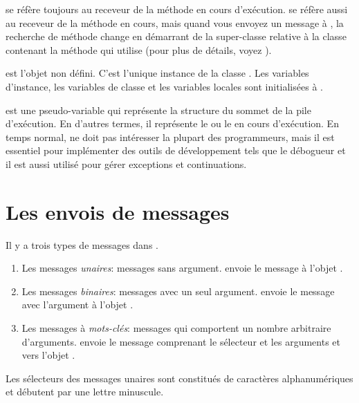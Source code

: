 \documentclass[a4paper,10pt,twoside]{book}
\begin{document}
 se r\'{e}f\`{e}re toujours au receveur de la m\'{e}thode en cours d'ex\'{e}cution.
 se r\'{e}f\`{e}re aussi au receveur de la m\'{e}thode en
cours, mais quand vous envoyez un message \`{a} \super, la recherche
de m\'{e}thode change en d\'{e}marrant de la super-classe relative \`{a} la classe contenant la m\'{e}thode qui utilise 
(pour plus de d\'{e}tails, voyez ).

 est l'objet non d\'{e}fini.
C'est l'unique instance de la classe . 
Les variables d'instance, les variables de classe et les variables locales  sont initialis\'{e}es \`{a} .

 est une pseudo-variable qui repr\'{e}sente la structure du sommet de la pile d'ex\'{e}cution.
En d'autres termes, il repr\'{e}sente le  ou le  en cours d'ex\'{e}cution.
En temps normal,  ne doit pas intéresser la plupart
des programmeurs, mais il est essentiel pour impl\'{e}menter des
outils de d\'{e}veloppement tels que le débogueur et il est aussi utilis\'{e} pour g\'{e}rer exceptions et continuations.

\section{Les envois de messages}

Il y a trois types de messages dans \sq.
\begin{enumerate}
  \item Les messages \emph{unaires}: messages sans argument.
   envoie le message   \`{a} l'objet .
  \item Les messages \emph{binaires}: messages avec un seul argument.
  	 envoie le message \ct{+} avec l'argument  \`{a} l'objet .
  \item Les messages \`{a} \emph{mots-cl\'{e}s}: messages qui comportent un nombre arbitraire d'arguments.
  	 envoie le message comprenant le s\'{e}lecteur 	 et les arguments  et  vers l'objet .
\end{enumerate}

Les s\'{e}lecteurs des messages unaires sont constitu\'{e}s de caract\`{e}res alphanum\'{e}riques et d\'{e}butent par une lettre minuscule. 
\end{document}
